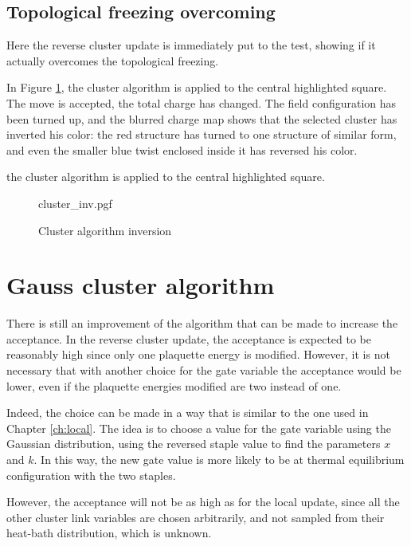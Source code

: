 \subsection*{Topological freezing overcoming}
Here the reverse cluster update is immediately put to the test,
showing if it actually overcomes the topological freezing.


In Figure \ref{fig:cluster_inv}, the cluster algorithm is applied to the central highlighted square.
The move is accepted, the total charge has changed.
The field configuration has been turned up,
and the blurred charge map shows that the selected cluster has inverted his color:
the red structure has turned to one structure of similar form,
and even the smaller blue twist enclosed inside it has reversed his color.

the cluster algorithm is applied to the central highlighted square.

\begin{figure}[!htb]
    \centering
    {cluster_inv.pgf}
    \caption{Cluster algorithm inversion}
    \label{fig:cluster_inv}
\end{figure}



\section{Gauss cluster algorithm}

There is still an improvement of the algorithm that can be made to increase the acceptance.
In the reverse cluster update,
the acceptance is expected to be reasonably high since only one plaquette energy is modified.
However, it is not necessary that with another choice for the gate variable the acceptance would be lower,
even if the plaquette energies modified are two instead of one.

Indeed, the choice can be made in a way that is similar to the one used in Chapter \ref{ch:local}.
The idea is to choose a value for the gate variable using the Gaussian distribution,
using the reversed staple value to find the parameters $x$ and $k$.
In this way, the new gate value is more likely to be at thermal equilibrium configuration with the two staples.

However, the acceptance will not be as high as for the local update,
since all the other cluster link variables are chosen arbitrarily,
and not sampled from their heat-bath distribution, which is unknown.

